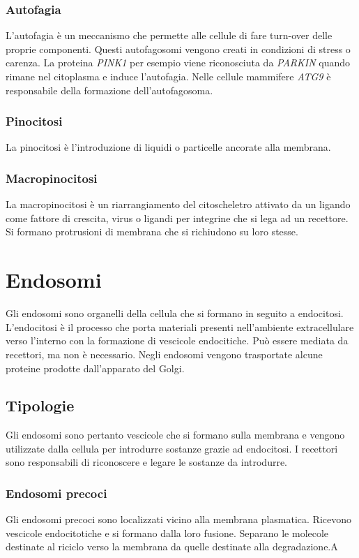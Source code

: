 		\subsubsection{Autofagia}
		L'autofagia \`e un meccanismo che permette alle cellule di fare turn-over delle proprie componenti.
		Questi autofagosomi vengono creati in condizioni di stress o carenza.
		La proteina \emph{PINK1} per esempio viene riconosciuta da \emph{PARKIN} quando rimane nel citoplasma e induce l'autofagia.
		Nelle cellule mammifere \emph{ATG9} \`e responsabile della formazione dell'autofagosoma.

		\subsubsection{Pinocitosi}
		La pinocitosi \`e l'introduzione di liquidi o particelle ancorate alla membrana.

		\subsubsection{Macropinocitosi}
		La macropinocitosi \`e un riarrangiamento del citoscheletro attivato da un ligando come fattore di crescita, virus o ligandi per integrine che si lega ad un recettore.
		Si formano protrusioni di membrana che si richiudono su loro stesse.

\section{Endosomi}
Gli endosomi sono organelli della cellula che si formano in seguito a endocitosi.
L'endocitosi \`e il processo che porta materiali presenti nell'ambiente extracellulare verso l'interno con la formazione di vescicole endocitiche.
Pu\`o essere mediata da recettori, ma non \`e necessario.
Negli endosomi vengono trasportate alcune proteine prodotte dall'apparato del Golgi.

	\subsection{Tipologie}
	Gli endosomi sono pertanto vescicole che si formano sulla membrana e vengono utilizzate dalla cellula per introdurre sostanze grazie ad endocitosi.
	I recettori sono responsabili di riconoscere e legare le sostanze da introdurre.

		\subsubsection{Endosomi precoci}
		Gli endosomi precoci sono localizzati vicino alla membrana plasmatica.
		Ricevono vescicole endocitotiche e si formano dalla loro fusione.
		Separano le molecole destinate al riciclo verso la membrana da quelle destinate alla degradazione.A
		
